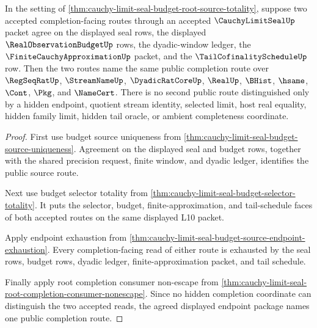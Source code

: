 \begin{theorem}
\label{thm:cauchy-limit-seal-completion-route-uniqueness}
In the setting of \autoref{thm:cauchy-limit-seal-budget-root-source-totality}, suppose two accepted completion-facing routes through an accepted $\CauchyLimitSealUp$ packet agree on the displayed seal rows, the displayed $\RealObservationBudgetUp$ rows, the dyadic-window ledger, the $\FiniteCauchyApproximationUp$ packet, and the $\TailCofinalityScheduleUp$ row. Then the two routes name the same public completion route over $\RegSeqRatUp$, $\StreamNameUp$, $\DyadicRatCoreUp$, $\RealUp$, $\BHist$, $\hsame$, $\Cont$, $\Pkg$, and $\NameCert$. There is no second public route distinguished only by a hidden endpoint, quotient stream identity, selected limit, host real equality, hidden family limit, hidden tail oracle, or ambient completeness coordinate.
\end{theorem}
\begin{proof}
First use budget source uniqueness from \autoref{thm:cauchy-limit-seal-budget-source-uniqueness}. Agreement on the displayed seal and budget rows, together with the shared precision request, finite window, and dyadic ledger, identifies the public source route.

Next use budget selector totality from \autoref{thm:cauchy-limit-seal-budget-selector-totality}. It puts the selector, budget, finite-approximation, and tail-schedule faces of both accepted routes on the same displayed L10 packet.

Apply endpoint exhaustion from \autoref{thm:cauchy-limit-seal-budget-source-endpoint-exhaustion}. Every completion-facing read of either route is exhausted by the seal rows, budget rows, dyadic ledger, finite-approximation packet, and tail schedule.

Finally apply root completion consumer non-escape from \autoref{thm:cauchy-limit-seal-root-completion-consumer-nonescape}. Since no hidden completion coordinate can distinguish the two accepted reads, the agreed displayed endpoint package names one public completion route.
\end{proof}


